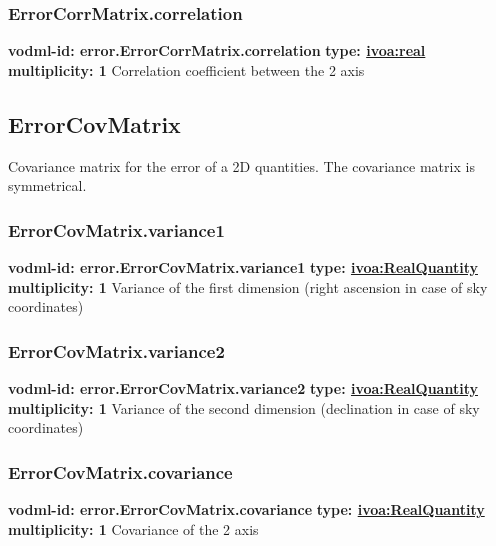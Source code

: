     \subsubsection{ErrorCorrMatrix.correlation}
      \textbf{vodml-id: error.ErrorCorrMatrix.correlation} \newline
      \textbf{type: \hyperref[sect:ivoa]{ivoa:real}} \newline
      \textbf{multiplicity: 1} \newline 
      Correlation coefficient between the 2 axis

  \subsection{ErrorCovMatrix}
  \label{sect:error.ErrorCovMatrix}
    Covariance matrix for the error of a 2D quantities. The covariance matrix is symmetrical.

    \subsubsection{ErrorCovMatrix.variance1}
      \textbf{vodml-id: error.ErrorCovMatrix.variance1} \newline
      \textbf{type: \hyperref[sect:ivoa]{ivoa:RealQuantity}} \newline
      \textbf{multiplicity: 1} \newline 
      Variance of the first dimension (right ascension in case of sky coordinates)

    \subsubsection{ErrorCovMatrix.variance2}
      \textbf{vodml-id: error.ErrorCovMatrix.variance2} \newline
      \textbf{type: \hyperref[sect:ivoa]{ivoa:RealQuantity}} \newline
      \textbf{multiplicity: 1} \newline 
      Variance of the second dimension (declination in case of sky coordinates)

    \subsubsection{ErrorCovMatrix.covariance}
      \textbf{vodml-id: error.ErrorCovMatrix.covariance} \newline
      \textbf{type: \hyperref[sect:ivoa]{ivoa:RealQuantity}} \newline
      \textbf{multiplicity: 1} \newline 
      Covariance of the 2 axis

